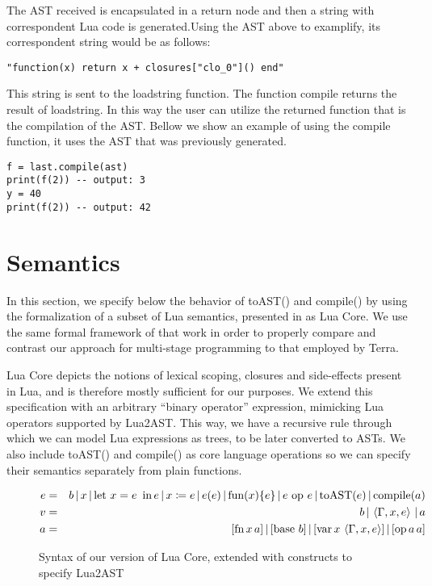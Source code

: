 \documentclass[english]{llncs}
\begin{document}
The AST received is encapsulated in a return node and then a string with correspondent Lua code is generated.Using the AST above to examplify, its correspondent string would be as follows:


\begin{verbatim}
"function(x) return x + closures["clo_0"]() end"
\end{verbatim}

This string is sent to the loadstring function.
The function compile returns the result of loadstring.
In this way the user can utilize the returned function that is the compilation of the AST.
Bellow we show an example of using the compile function, it uses the AST that was previously generated.


\begin{verbatim}
f = last.compile(ast)
print(f(2)) -- output: 3
y = 40
print(f(2)) -- output: 42
\end{verbatim}



\section{Semantics}
\label{sec:semantics}

\label{sec:semantics}

In this section, we specify below the behavior of toAST() and compile()
by using the formalization of a subset of Lua semantics, presented
in \cite{DeVito2013Terra} as Lua Core. We use the same formal framework
of that work in order to properly compare and contrast our approach
for multi-stage programming to that employed by Terra.

Lua Core depicts the notions of lexical scoping, closures and side-effects
present in Lua, and is therefore mostly sufficient for our purposes.
We extend this specification with an arbitrary ``binary operator''
expression, mimicking Lua operators supported by Lua2AST. This way,
we have a recursive rule through which we can model Lua expressions
as trees, to be later converted to ASTs. We also include toAST() and
compile() as core language operations so we can specify their semantics
separately from plain functions.

\begin{figure}[t]
\begin{eqnarray*}
e & = & b\,|\, x\,|\,\mbox{let \ensuremath{x=e}\,\ in\,\ensuremath{e}}\,|\, x\coloneqq e\,|\, e(e)\,|\,\mbox{fun}(x)\{e\}\,|\, e\mbox{ op }e\,|\,\mbox{toAST}(e)\,|\,\mbox{compile}(a)\\
v & = & b\,|\,\left\langle \Gamma,x,e\right\rangle \,|\, a\\
a & = & [\mbox{fn\,\ensuremath{x}\,\ensuremath{a}}]\,|\,[\mbox{base \ensuremath{b}}]\,|\,[\mbox{var}\, x\,\left\langle \Gamma,x,e\right\rangle ]\,|\,[\mbox{op\,\ensuremath{a}\,\ensuremath{a}}]
\end{eqnarray*}
\protect\caption{\label{fig:LuaCoreSyntax}Syntax of our version of Lua Core, extended
with constructs to specify Lua2AST}
\end{figure}
\end{document}
